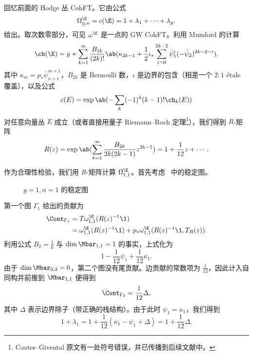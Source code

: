 \begin{exm}
    回忆前面的 Hodge 丛 CohFT。它由公式
    \[ \Omega^{\E}_{g,n} = c(\E) = 1 + \lambda_1 + \cdots + \lambda_g. \]
    给出。取次数零部分，可见 $\omega^{\E}$ 是一点的 GW CohFT。利用 Mumford 的计算
    \[ \ch(\E) = g + \sum_{k=1}^{\infty} \frac{B_{2k}}{(2k)!}\ab(\kappa_{2k-1} + \frac{1}{2}\iota_*\sum_{i=0}^{2k-2} \bar{\psi}_1^{i} (-\bar{\psi}_2)^{2k-2-i}), \]
    其中 $\kappa_{m} = p_* \bar{\psi}_{n+1}^{m+1}$，$B_{2k}$ 是 Bernoulli 数，$\iota$ 是边界的包含（相差一个 $2:1$ \'etale 覆盖），以及公式
    \[ c(E) = \exp \ab(-\sum_k (-1)^k (k-1)!\ch_k(E)) \]
    对任意向量丛 $E$ 成立（或者直接用量子 Riemann--Roch 定理\footnote{Coates--Givental 原文有一处符号错误，并已传播到后续文献中。}），我们得到 $R$-矩阵
    \[ R(z) = \exp\ab( \sum_{k=1}^{\infty} \frac{B_{2k}}{2k(2k-1)} z^{2k-1}) = 1+\frac{1}{12}z + \cdots. \]

    作为合理性检验，我们用 $R$-矩阵计算 $\Omega_{1,1}^{\E}$。首先考虑~ 中的稳定图。
    \begin{figure}[htpb]
    \begin{center}
    \end{center}
    \caption{$g=1, n=1$ 的稳定图}%
    \label{fig:03graphloop}
    \end{figure}
    第一个图 $\Gamma_1$ 给出的贡献为
    \begin{align*}
        \Cont_{\Gamma_1} &= T\omega_{1,1}^{\E}(R(z)^{-1}\1) \\
        &= \omega_{1,1}^{\E}(R(z)^{-1}\1) + p_* \omega_{1,1}^{\E}(R(z)^{-1}\1, T_R(z)).
    \end{align*}
    利用公式 $B_2 = \frac{1}{6}$ 与 $\dim \Mbar_{1,1} = 1$ 的事实，上式化为
    \[ 1 - \frac{1}{12}\psi_1 + \frac{1}{12} \kappa_1. \]
    由于 $\dim \Mbar_{0,3} = 0$，第二个图没有尾贡献。边贡献的常数项为 $\frac{1}{12}$，因此计入自同构并前推到 $\Mbar_{1,1}$ 便得到
    \[ \Cont_{\Gamma_2} = \frac{1}{12} \Delta, \]
    其中 $\Delta$ 表示边界除子（带正确的栈结构）。由于此时 $\psi_1 = \kappa_1$，我们得到
    \[ 1+\lambda_1 = 1 + \frac{1}{12}(\kappa_1 - \psi_1 + \Delta) = 1 + \frac{1}{12} \Delta. \]
\end{exm}




